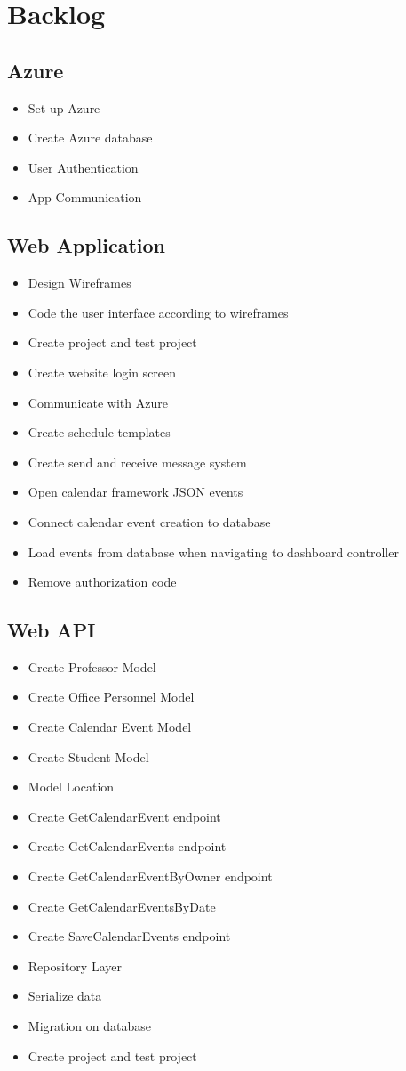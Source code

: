 \documentclass{article}
\begin{document}
{\section*{Backlog}
\subsection*{Azure}
\begin{itemize}
\item Set up Azure
\item Create Azure database
\item User Authentication
\item App Communication
\end{itemize}

\subsection*{Web Application}
\begin{itemize}
\item Design Wireframes
\item Code the user interface according to wireframes
\item Create project and test project
\item Create website login screen
\item Communicate with Azure
\item Create schedule templates
\item Create send and receive message system
\item Open calendar framework JSON events
\item Connect calendar event creation to database
\item Load events from database when navigating to dashboard controller
\item Remove authorization code
\end{itemize}

\subsection*{Web API}
\begin{itemize}
\item Create Professor Model
\item Create Office Personnel Model
\item Create Calendar Event Model
\item Create Student Model
\item Model Location
\item Create GetCalendarEvent endpoint
\item Create GetCalendarEvents endpoint
\item Create GetCalendarEventByOwner endpoint
\item Create GetCalendarEventsByDate
\item Create SaveCalendarEvents endpoint
\item Repository Layer
\item Serialize data
\item Migration on database
	\item Create project and test project
\end{itemize}

}
\end{document}
